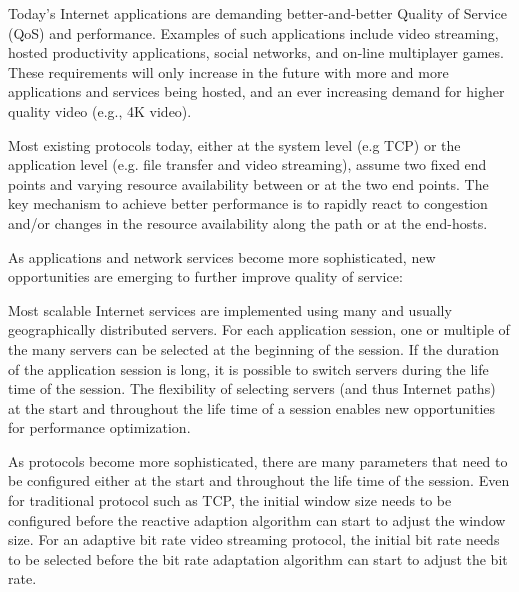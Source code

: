 \label{sec:intro}



Today's Internet applications are demanding better-and-better Quality of Service (QoS) and performance. Examples of such applications include video streaming, hosted productivity applications, social networks, and on-line multiplayer games. These requirements will only increase in the future with more and more applications and services being hosted, and an ever increasing demand for higher quality video (e.g., 4K video).

Most existing protocols today, either at the system level (e.g TCP) or the application level (e.g. file transfer and video streaming), assume two fixed end points and varying resource availability between or at the two end points.  The key mechanism to achieve better performance is to rapidly react to congestion and/or changes in the resource availability along the path or at the end-hosts. 

As applications and network services become more sophisticated,  new opportunities are emerging to further improve quality of service: 

  Most scalable Internet services are implemented using many and usually geographically distributed servers.  For each application session, one or multiple of the many servers can be selected at the beginning of the session.  If the duration of the application session is long, it is possible to switch servers during the life time of the session. 
The flexibility of selecting servers (and thus Internet paths) at the start and throughout the life time of a session enables new opportunities for performance optimization. 

 As protocols become more sophisticated, there are many parameters that need to be configured either at the start and throughout the life time of the session. Even for traditional protocol such as TCP, the initial window size needs to be configured before the reactive adaption algorithm can start to adjust the window size. For an adaptive bit rate video streaming protocol, the initial bit rate needs to be selected before the bit rate adaptation algorithm can start to adjust the bit rate. 

